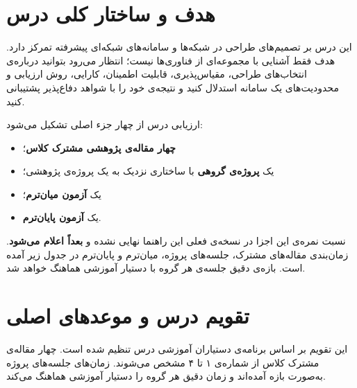 \documentclass[12pt]{article}
\newcommand{\pending}{\textbf{بعداً اعلام می‌شود}}
\begin{document}
	\graphicspath{{LaTeX_Common/cover/}}
	


\section{هدف و ساختار کلی درس}
این درس بر تصمیم‌های طراحی در شبکه‌ها و سامانه‌های شبکه‌ای پیشرفته تمرکز دارد. هدف فقط آشنایی با مجموعه‌ای از فناوری‌ها نیست؛ انتظار می‌رود بتوانید درباره‌ی انتخاب‌های طراحی، مقیاس‌پذیری، قابلیت اطمینان، کارایی، روش ارزیابی و محدودیت‌های یک سامانه استدلال کنید و نتیجه‌ی خود را با شواهد دفاع‌پذیر پشتیبانی کنید.

ارزیابی درس از چهار جزء اصلی تشکیل می‌شود:
\begin{itemize}[label=$\bullet$]
    \item \textbf{چهار مقاله‌ی پژوهشی مشترک کلاس}؛
    \item یک \textbf{پروژه‌ی گروهی} با ساختاری نزدیک به یک پروژه‌ی پژوهشی؛
    \item یک \textbf{آزمون میان‌ترم}؛
    \item یک \textbf{آزمون پایان‌ترم}.
\end{itemize}

نسبت نمره‌ی این اجزا در نسخه‌ی فعلی این راهنما نهایی نشده و \pending. زمان‌بندی مقاله‌های مشترک، جلسه‌های پروژه، میان‌ترم و پایان‌ترم در جدول زیر آمده است. بازه‌ی دقیق جلسه‌ی هر گروه با دستیار آموزشی هماهنگ خواهد شد.

\section{تقویم درس و موعدهای اصلی}
این تقویم بر اساس برنامه‌ی دستیاران آموزشی درس تنظیم شده است. چهار مقاله‌ی مشترک کلاس از شماره‌ی ۱ تا ۴ مشخص می‌شوند. زمان‌های جلسه‌های پروژه به‌صورت بازه آمده‌اند و زمان دقیق هر گروه را دستیار آموزشی هماهنگ می‌کند.
\end{document}
